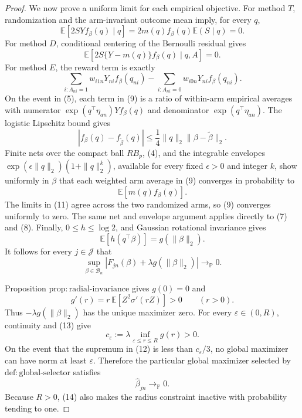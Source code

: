 \documentclass{article}
\begin{document}
\begin{proof}
We now prove a uniform limit for each empirical objective.  For method
\(T\), randomization and the arm-invariant outcome mean imply, for every
\(q\),
\[
 \mathbb E[2S Y f_\beta(q)\mid q]
 =2m(q)f_\beta(q)\mathbb E(S\mid q)=0.
 \tag{7}
\]
For method \(D\), conditional centering of the Bernoulli residual gives
\[
 \mathbb E[2S\{Y-m(q)\}f_\beta(q)\mid q,A]=0.
 \tag{8}
\]
For method \(E\), the reward term is exactly
\[
 \sum_{i:A_{ni}=1}w_{i1n}Y_{ni}f_\beta(q_{ni})
 -\sum_{i:A_{ni}=0}w_{i0n}Y_{ni}f_\beta(q_{ni}).
 \tag{9}
\]
On the event in (5), each term in (9) is a ratio of within-arm empirical
averages with numerator
\(\exp(q^\top\eta_{an})Yf_\beta(q)\) and denominator
\(\exp(q^\top\eta_{an})\).  The logistic Lipschitz bound gives
\[
 |f_\beta(q)-f_{\widetilde\beta}(q)|
 \le\frac14\|q\|_2\|\beta-\widetilde\beta\|_2.
 \tag{10}
\]
Finite nets over the compact ball \(RB_p\), (4), and the integrable envelopes
\(\exp(\epsilon\|q\|_2)(1+\|q\|_2^k)\), available for every fixed
\(\epsilon>0\) and integer \(k\), show uniformly in \(\beta\) that each
weighted arm average in (9) converges in probability to
\[
 \mathbb E[m(q)f_\beta(q)].
 \tag{11}
\]
The limits in (11) agree across the two randomized arms, so (9) converges
uniformly to zero.  The same net and envelope argument applies directly to
(7) and (8).  Finally, \(0\le h\le\log2\), and Gaussian rotational
invariance gives
\[
 \mathbb E[h(q^\top\beta)]=g(\|\beta\|_2).
\]
It follows for every \(j\in\mathcal J\) that
\[
 \sup_{\beta\in\mathcal B_n}
 \left|F_{jn}(\beta)+\lambda g(\|\beta\|_2)\right|
 \longrightarrow_{\mathbb P}0.
 \tag{12}
\]

Proposition \(\mathrm{prop{:}radial\mbox{-}invariance}\) gives \(g(0)=0\)
and
\[
 g'(r)=r\,\mathbb E[Z^2\sigma'(rZ)]>0
 \qquad(r>0).
 \tag{13}
\]
Thus \(-\lambda g(\|\beta\|_2)\) has the unique maximizer zero.  For every
\(\varepsilon\in(0,R)\), continuity and (13) give
\[
 c_\varepsilon
 :=\lambda\inf_{\varepsilon\le r\le R}g(r)>0.
\]
On the event that the supremum in (12) is less than
\(c_\varepsilon/3\), no global maximizer can have norm at least
\(\varepsilon\).  Therefore the particular global maximizer selected by
\(\mathrm{def{:}global\mbox{-}selector}\) satisfies
\[
 \widehat\beta_{jn}\longrightarrow_{\mathbb P}0.
 \tag{14}
\]
Because \(R>0\), (14) also makes the radius constraint inactive with
probability tending to one.


\end{proof}
\end{document}
